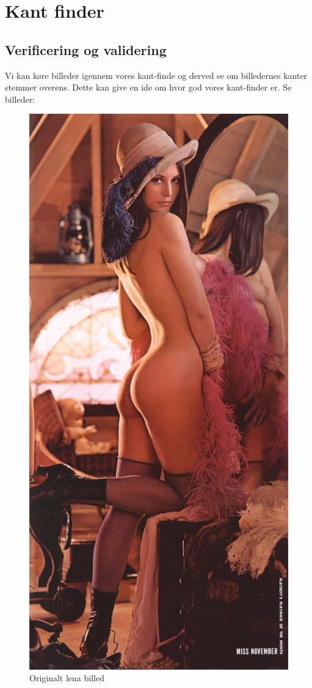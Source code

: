 \section{Kant finder}
\subsection{Verificering og validering}
Vi kan køre billeder igennem vores kant-finde og derved se om billedernes kanter stemmer overens.
Dette kan give en ide om hvor god vores kant-finder er.
Se billeder:
\begin{figure}
\centering
\includegraphics[scale=0.3]{lena}
\caption{Originalt lena billed}
\end{figure}
